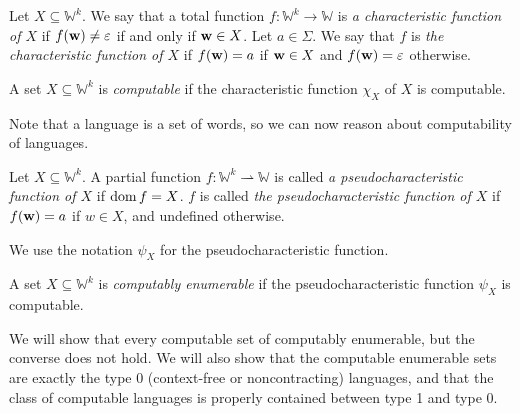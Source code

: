 \begin{definition}
	Let \( X \subseteq \mathbb W^k \).
	We say that a total function \( f \colon \mathbb W^k \to \mathbb W \) is \emph{a characteristic function of \( X \)} if \( f(\vb w) \neq \varepsilon \) if and only if \( \vb w \in X \).
	Let \( a \in \Sigma \).
	We say that \( f \) is \emph{the characteristic function of \( X \)} if \( f(\vb w) = a \) if \( \vb w \in X \) and \( f(\vb w) = \varepsilon \) otherwise.
\end{definition}
\begin{definition}
	A set \( X \subseteq \mathbb W^k \) is \emph{computable} if the characteristic function \( \chi_X \) of \( X \) is computable.
\end{definition}
Note that a language is a set of words, so we can now reason about computability of languages.
\begin{definition}
	Let \( X \subseteq \mathbb W^k \).
	A partial function \( f \colon \mathbb W^k \rightharpoonup \mathbb W \) is called \emph{a pseudocharacteristic function of \( X \)} if \( \operatorname{dom} f = X \).
	\( f \) is called \emph{the pseudocharacteristic function of \( X \)} if \( f(\vb w) = a \) if \( w \in X \), and undefined otherwise.
\end{definition}
We use the notation \( \psi_X \) for the pseudocharacteristic function.
\begin{definition}
	A set \( X \subseteq \mathbb W^k \) is \emph{computably enumerable} if the pseudocharacteristic function \( \psi_X \) is computable.
\end{definition}
\begin{remark}
	We will show that every computable set of computably enumerable, but the converse does not hold.
	We will also show that the computable enumerable sets are exactly the type 0 (context-free or noncontracting) languages, and that the class of computable languages is properly contained between type 1 and type 0.
\end{remark}


